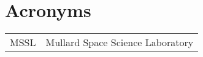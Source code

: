 \newpage



\section*{Acronyms}

\begin{tabular}{l l}
MSSL & Mullard Space Science Laboratory\\
\end{tabular}

\newpage

